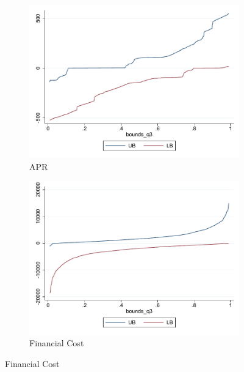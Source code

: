 \documentclass[oneside,11pt]{article}
\begin{document}
\begin{figure}[H]
    \caption{}
    \label{}
    \begin{center}

    \begin{subfigure}{0.475\textwidth}
        \caption{APR}
        \centering
        \includegraphics[width=\textwidth]{Figuras/fan_park_qbounds_apr.pdf}
    \end{subfigure}
    \begin{subfigure}{0.475\textwidth}
        \caption{Financial Cost}
        \centering
        \includegraphics[width=\textwidth]{Figuras/fan_park_qbounds_fc_admin.pdf}
    \end{subfigure}

    \end{center}
\end{figure}
\end{document}
